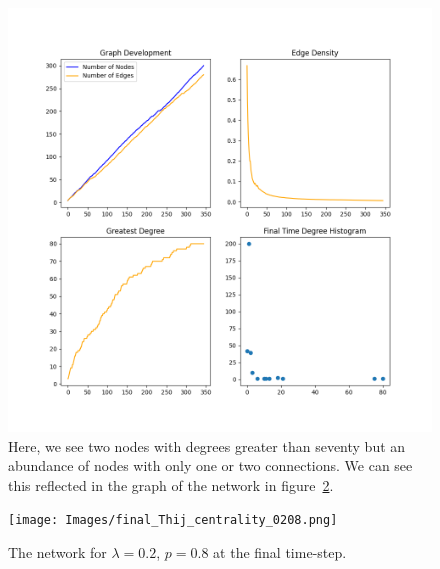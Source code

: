 \begin{figure}[h!]
    \includegraphics[width=14cm]{Images/twitter_sim_stats_3_0.2_0.8.png}
    \centering
    \caption{Here, we see two nodes with degrees greater than seventy
    but an abundance of nodes with only one or two connections. We can see this 
    reflected in the graph of the network in figure~\ref{fig:network0208}. }
    \label{fig:twittersim28}
\end{figure}


\begin{figure}[h!]
    \texttt{[image: Images/final\_Thij\_centrality\_0208.png]}
    \centering
    \caption{The network for $\lambda=0.2$, $p=0.8$ at the final time-step.}
    \label{fig:network0208}
\end{figure}

\clearpage

